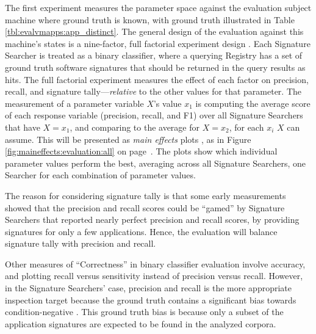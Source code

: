 \documentclass[11pt]{ucthesis}
\theoremstyle{plain}
\theoremstyle{definition}
\begin{document}
The first experiment measures the parameter space against the evaluation subject machine where ground truth is known, with ground truth illustrated in Table \ref{tbl:evalvmapps:app_distinct}.  The general design of the evaluation against this machine's states is a nine-factor, full factorial experiment design \cite{box:wiley78}.  Each Signature Searcher is treated as a binary classifier, where a querying Registry has a set of ground truth software signatures that should be returned in the query results as hits.  The full factorial experiment measures the effect of each factor on precision, recall, and signature tally---\emph{relative} to the other values for that parameter.  The measurement of a parameter variable $X$'s value $x_1$ is computing the average score of each response variable (precision, recall, and F1) over all Signature Searchers that have $X=x_1$, and comparing to the average for $X=x_2$, for each $x_i$ $X$ can assume.  This will be presented as \emph{main effects} plots \cite{box:wiley78}, as in Figure \ref{fig:maineffects:evaluation:all} on page~\pageref{fig:maineffects:evaluation:all}.  The plots show which individual parameter values perform the best, averaging across all Signature Searchers, one Searcher for each combination of parameter values.

The reason for considering signature tally is that some early measurements showed that the precision and recall scores could be ``gamed'' by Signature Searchers that reported nearly perfect precision and recall scores, by providing signatures for only a few applications.  Hence, the evaluation will balance signature tally with precision and recall.

Other measures of ``Correctness'' in binary classifier evaluation involve accuracy, and plotting recall versus sensitivity instead of precision versus recall.  However, in the Signature Searchers' case, precision and recall is the more appropriate inspection target because the ground truth contains a significant bias towards condition-negative \cite{davis:icml06}.  This ground truth bias is because only a subset of the application signatures are expected to be found in the analyzed corpora.
\end{document}
